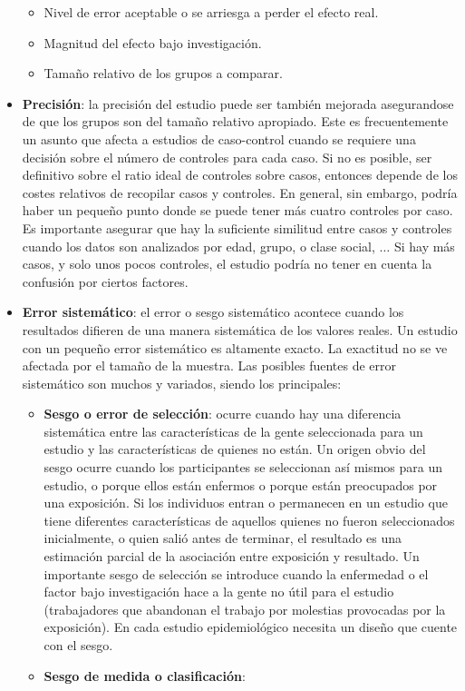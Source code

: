 \begin{itemize}[itemsep=0pt,parsep=0pt,topsep=0pt,partopsep=0pt]
\begin{itemize}[itemsep=0pt,parsep=0pt,topsep=0pt,partopsep=0pt]
		\item Nivel de error aceptable o se arriesga a perder el efecto real.
		\item Magnitud del efecto bajo investigación.
		\item Tamaño relativo de los grupos a comparar.
	\end{itemize}
	\item\textbf{Precisión}: la precisión del estudio puede ser también mejorada asegurandose de que los grupos son del tamaño relativo apropiado. Este es frecuentemente un asunto que afecta a estudios de caso-control cuando se requiere una decisión sobre el número de controles para cada caso. Si no es posible, ser definitivo sobre el ratio ideal de controles sobre casos, entonces depende de los costes relativos de recopilar casos y controles. En general, sin embargo, podría haber un pequeño punto donde se puede tener más cuatro controles por caso. Es importante asegurar que hay la suficiente similitud entre casos y controles cuando los datos son analizados por edad, grupo, o clase social, $\dots$ Si hay más casos, y solo unos pocos controles, el estudio podría no tener en cuenta la confusión por ciertos factores.
	\item\textbf{Error sistemático}: el error o sesgo sistemático acontece cuando los resultados difieren de una manera sistemática de los valores reales. Un estudio con un pequeño error sistemático es altamente exacto. La exactitud no se ve afectada por el tamaño de la muestra. Las posibles fuentes de error sistemático son muchos y variados, siendo los principales:
	\begin{itemize}[itemsep=0pt,parsep=0pt,topsep=0pt,partopsep=0pt]
		\item \textbf{Sesgo o error de selección}: ocurre cuando hay una diferencia sistemática entre las características de la gente seleccionada para un estudio y las características de quienes no están. Un origen obvio del sesgo ocurre cuando los participantes se seleccionan así mismos para un estudio, o porque ellos están enfermos o porque están preocupados por una exposición. Si los individuos entran o permanecen en un estudio que tiene diferentes características de aquellos quienes no fueron seleccionados inicialmente, o quien salió antes de terminar, el resultado es una estimación parcial de la asociación entre exposición y resultado. Un importante sesgo de selección se introduce cuando la enfermedad o el factor bajo investigación hace a la gente no útil para el estudio (trabajadores que abandonan el trabajo por molestias provocadas por la exposición). En cada estudio epidemiológico necesita un diseño que cuente con el sesgo.
		\item \textbf{Sesgo de medida o clasificación}:
	\end{itemize}
\end{itemize}